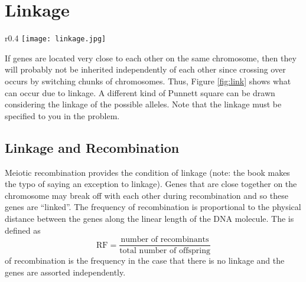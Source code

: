 \documentclass[../Bio_chemistryReview.tex]{subfiles}
\begin{document}
\section{Linkage}
\begin{wrapfigure}[12]{r}{0.4\textwidth}
  \centering
  \vspace{-11pt}
  \texttt{[image: linkage.jpg]}
  \caption{Linkage of Alleles during Meiosis}
  \label{fig:link}
\end{wrapfigure}
If genes are located very close to each other on the same chromosome, then they
will probably not be inherited independently of each other since crossing over
occurs by switching chunks of chromosomes. Thus, Figure \ref{fig:link} shows
what can occur due to linkage. A different kind of Punnett square can be drawn
considering the linkage of the possible alleles. Note that the linkage must be
specified to you in the problem.

\subsection{Linkage and Recombination}
Meiotic recombination provides the condition of linkage (note: the book makes
the typo of saying an exception to linkage). Genes that are close together on
the chromosome may break off with each other during recombination and so these
genes are ``linked''. The frequency of recombination is proportional to the
physical distance between the genes along the linear length of the DNA molecule.
The  is defined as
\[ \text{RF} = \frac{\mbox{number of recombinants}}{\mbox{total number of
offspring}} \]
 of recombination is the frequency in the case that
there is no linkage and the genes are assorted independently.
\end{document}
